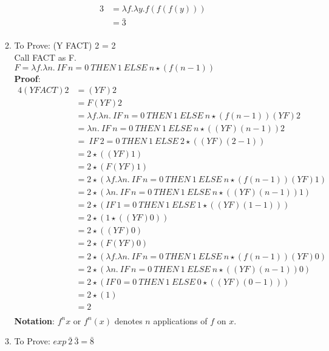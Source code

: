 \documentclass[11pt]{article}
\begin{document}
\begin{enumerate}
\begin{enumerate}
\begin{alignat*}{3}
                        &= \lambda f. \lambda y. f ( f(f(y)))\\
                    &= \bar{3}\\
            \end{alignat*}
    \item To Prove: (Y FACT) 2 = 2\\
    Call FACT as F.\\ $F= \lambda f. \lambda n.\:IF\:n = 0\:THEN\:1\:ELSE\:n\star
(f (n-1))$\\
          \textbf{Proof}:  \begin{alignat*}{4}
                (Y FACT) 2  &=(Y F) 2\\
                &= F (Y F) 2 \\
                &= \lambda f. \lambda n.\:IF\:n =0\:THEN\:1\:ELSE\:n\star(f(n-1)) (Y F) 2\\
        &= \lambda n.\:IF\:n = 0\:THEN\:1\:ELSE\:n\star((YF)(n-1)) 2 \\
        &= \:IF\:2 = 0\:THEN\:1\:ELSE\:2\star ((YF)(2-1))\\
        &= 2\star((YF)1)\\
        &= 2\star(F (YF)1)\\
        &= 2\star( \lambda f. \lambda n.\:IF\:n =0\:THEN\:1\:ELSE\:n\star(f(n-1)) (Y F) 1 )\\
        &= 2\star( \lambda n.\:IF\:n =0\:THEN\:1\:ELSE\:n\star((Y F)(n-1))  1 )\\
        &= 2\star( IF\:1 =0\:THEN\:1\:ELSE\:1\star((Y F)(1-1)) )\\
        &= 2\star(1\star ( (YF) 0  )   )\\
        &= 2\star( (YF) 0)\\
        &= 2\star( F(YF) 0)\\
        &= 2\star( \lambda f. \lambda n.\:IF\:n =0\:THEN\:1\:ELSE\:n\star(f(n-1)) (Y F) 0 )\\
        &=  2\star( \lambda n.\:IF\:n =0\:THEN\:1\:ELSE\:n\star((Y F)(n-1))  0)\\
        &= 2\star( IF\:0 =0\:THEN\:1\:ELSE\:0\star((Y F)(0-1)) )\\
        &= 2\star(1) \\
                    &= 2\\
            \end{alignat*}
\pagebreak
\Large{   \textbf{Notation}: $f^n x$ or $f^n(x)$  denotes $n$ applications of $f$ on $x$.}\\

\item To Prove: $exp\:\bar{2}\:\bar{3} = \bar{8}$\\


\end{enumerate}
\end{enumerate}
\end{document}
